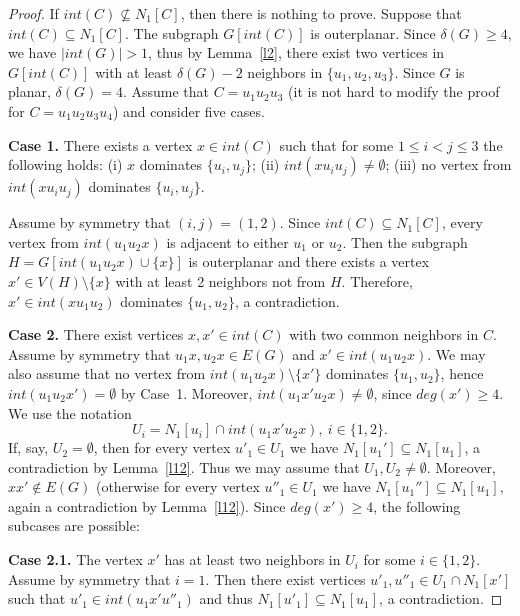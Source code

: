 \documentclass[12pt]{article}
\begin{document}
\begin{proof}
If $int(C) \nsubseteq N_1[C]$, then there is nothing to prove. Suppose that $int(C) \subseteq N_1[C]$. The subgraph $G[int(C)]$ is outerplanar.  Since $\delta(G) \geq 4$, we have $|int(G)| > 1$, thus by Lemma~\ref{l2}, there exist two vertices in $G[int(C)]$ with at least $\delta(G) - 2$ neighbors in $\{u_1,u_2,u_3\}$. Since $G$ is planar, $\delta(G) = 4$. Assume that $C = u_1u_2u_3$ (it is not hard to modify the proof for $C = u_1u_2u_3u_4$) and consider five cases.

\textbf{Case 1.} There exists a vertex $x \in int(C)$ such that for some $1 \leq i < j \leq 3$ the following holds: (i) $x$ dominates $\{u_i,u_j\}$; (ii) $int(xu_iu_j) \neq \emptyset$;  (iii) no vertex from $int(xu_iu_j)$ dominates $\{u_i,u_j\}$. 

Assume by symmetry that $(i,j) = (1,2)$. Since $int(C) \subseteq N_1[C]$, every vertex from $int(u_1u_2x)$ is adjacent to either $u_1$ or $u_2$. Then the subgraph $H = G[int(u_1u_2x) \cup \{x\}]$ is outerplanar and there exists a vertex $x' \in V(H) \setminus \{x\}$ with at least 2 neighbors not from $H$. Therefore, $x' \in int(xu_1u_2)$ dominates $\{u_1,u_2\}$, a contradiction.


\textbf{Case 2.} There exist vertices $x,x' \in int(C)$ with two common neighbors in $C$. Assume by symmetry that $u_1x,u_2x \in E(G)$ and $x' \in int(u_1u_2x)$. We may also assume that no vertex from $int(u_1u_2x) \setminus \{x'\}$ dominates $\{u_1,u_2\}$, hence $int(u_1u_2x') = \emptyset$ by Case~1. Moreover, $int(u_1x'u_2x) \neq \emptyset$, since $deg(x') \geq 4$. We use the notation $$U_i = N_1[u_i] \cap int(u_1x'u_2x), \ i \in \{1,2\}.$$ If, say, $U_2 = \emptyset$, then for every vertex $u'_1 \in U_1$ we have $N_1[u_1'] \subseteq N_1[u_1]$, a contradiction by Lemma~\ref{l12}. Thus we may assume that $U_1,U_2 \neq \emptyset$. Moreover, $xx' \notin E(G)$ (otherwise for every vertex $u''_1 \in U_1$ we have $N_1[u_1''] \subseteq N_1[u_1]$, again a contradiction by Lemma~\ref{l12}). Since $deg(x') \geq 4$, the following subcases are possible:

\textbf{Case 2.1.} The vertex $x'$ has at least two neighbors in $U_i$ for some $i \in \{1,2\}$. Assume by symmetry that $i = 1$. Then there exist vertices $u'_1,u''_1 \in U_1 \cap N_1[x']$ such that $u'_1 \in int(u_1x'u''_1)$ and thus $N_1[u'_1] \subseteq N_1[u_1]$, a contradiction.


\end{proof}
\end{document}
